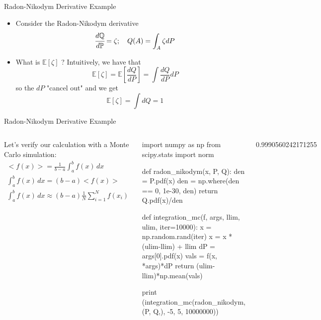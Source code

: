 \documentclass{beamer}
\begin{document}
\begin{frame}[fragile]{Radon-Nikodym Derivative Example}
\begin{itemize}
    \item Consider the Radon-Nikodym derivative
\begin{equation*}
\cfrac{d\mathbb{Q}}{d\mathbb{P}}=\zeta;\quad Q(A) = \int_A \zeta dP
\end{equation*}
    \item What is $\mathbb{E}[\zeta]$ ? Intuitively, we have that
\begin{equation*}
\mathbb{E}[\zeta]=\mathbb{E}\left[\frac{dQ}{dP}\right]=\int \frac{dQ}{dP} dP
\end{equation*}
so the $dP$ "cancel out" and we get
\begin{equation*}
\mathbb{E}[\zeta]=\int dQ = 1
\end{equation*}
\end{itemize}
\end{frame}

\begin{frame}[fragile]{Radon-Nikodym Derivative Example}
\begin{columns}
    Let's verify our calculation with a Monte Carlo simulation:
    \begin{equation*}
        \begin{gathered}
        <f(x)> = \frac{1}{b-a}  \int_{a}^{b} f(x) \,dx\\
        \int_{a}^{b} f(x) \,dx = (b-a) <f(x)>\\
        \int_{a}^{b} f(x) \,dx \approx (b-a) \frac{1}{N} \sum_{i=1}^{N} f(x_i)
        \end{gathered}
    \end{equation*}

\begin{ipython}
import numpy as np
from scipy.stats import norm

def radon_nikodym(x, P, Q):
    den = P.pdf(x)
    den = np.where(den == 0, 1e-30, den)
    return Q.pdf(x)/den

def integration_mc(f, args, llim, ulim, iter=10000):
    x = np.random.rand(iter)
    x = x * (ulim-llim) + llim
    dP = args[0].pdf(x)
    vals = f(x, *args)*dP
    return (ulim-llim)*np.mean(vals)

print (integration_mc(radon_nikodym, (P, Q,), 
                      -5, 5, 10000000))
\end{ipython}	
\begin{ioutput}
	
0.9990560242171255
\end{ioutput}	
\end{columns}
\end{frame}
\end{document}
